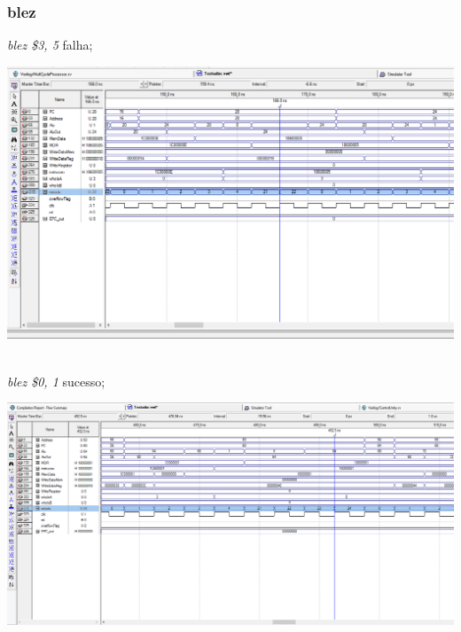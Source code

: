 \documentclass{article}
\begin{document}
    \subsubsection{blez}
    {\it blez \$3, 5} falha;\\
    \begin{center}
        \includegraphics[scale=0.25]{blezfalha.PNG}
    \end{center}
    \\
    {\it blez \$0, 1} sucesso;\\
    \begin{center}
        \includegraphics[scale=0.25]{blezsucesso.PNG}
    \end{center}
    
    \\
\end{document}
